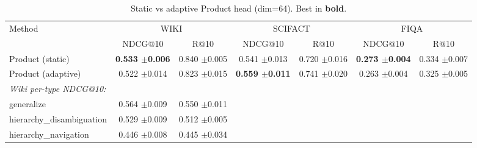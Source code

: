 \begin{table}[t]
\caption{Static vs adaptive Product head (dim=64). Best in \textbf{bold}.}
\label{tab:adaptive}
\centering
\small
\begin{tabular}{lcccccc}
\toprule
Method & \multicolumn{2}{c}{WIKI} & \multicolumn{2}{c}{SCIFACT} & \multicolumn{2}{c}{FIQA} \\
 & NDCG@10 & R@10 & NDCG@10 & R@10 & NDCG@10 & R@10 \\
\midrule
Product (static) & \textbf{0.533 {\scriptsize$\pm$0.006}} & 0.840 {\scriptsize$\pm$0.005} & 0.541 {\scriptsize$\pm$0.013} & 0.720 {\scriptsize$\pm$0.016} & \textbf{0.273 {\scriptsize$\pm$0.004}} & 0.334 {\scriptsize$\pm$0.007} \\
Product (adaptive) & 0.522 {\scriptsize$\pm$0.014} & 0.823 {\scriptsize$\pm$0.015} & \textbf{0.559 {\scriptsize$\pm$0.011}} & 0.741 {\scriptsize$\pm$0.020} & 0.263 {\scriptsize$\pm$0.004} & 0.325 {\scriptsize$\pm$0.005} \\
\midrule
\multicolumn{7}{l}{\textit{Wiki per-type NDCG@10:}} \\
\quad generalize & 0.564 {\scriptsize$\pm$0.009} & 0.550 {\scriptsize$\pm$0.011} &  &  &  &  \\
\quad hierarchy_disambiguation & 0.529 {\scriptsize$\pm$0.009} & 0.512 {\scriptsize$\pm$0.005} &  &  &  &  \\
\quad hierarchy_navigation & 0.446 {\scriptsize$\pm$0.008} & 0.445 {\scriptsize$\pm$0.034} &  &  &  &  \\
\bottomrule
\end{tabular}
\end{table}